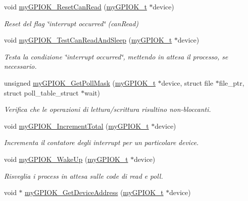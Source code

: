\begin{DoxyCompactItemize}
void \hyperlink{group___linux-_driver_ga6dc0ec06b388522ffc524e5fd14d8b72}{my\+G\+P\+I\+O\+K\+\_\+\+Reset\+Can\+Read} (\hyperlink{structmy_g_p_i_o_k__t}{my\+G\+P\+I\+O\+K\+\_\+t} $\ast$device)
\begin{DoxyCompactList}\small\item\em Reset del flag \char`\"{}interrupt occurred\char`\"{} (can\+Read) \end{DoxyCompactList}\item 
void \hyperlink{group___linux-_driver_gaf1b6f35c097c46361d675a42f122828e}{my\+G\+P\+I\+O\+K\+\_\+\+Test\+Can\+Read\+And\+Sleep} (\hyperlink{structmy_g_p_i_o_k__t}{my\+G\+P\+I\+O\+K\+\_\+t} $\ast$device)
\begin{DoxyCompactList}\small\item\em Testa la condizione \char`\"{}interrupt occurred\char`\"{}, mettendo in attesa il processo, se necessario. \end{DoxyCompactList}\item 
unsigned \hyperlink{group___linux-_driver_gae428f50a6da69e3cf89348b8ba9401b1}{my\+G\+P\+I\+O\+K\+\_\+\+Get\+Poll\+Mask} (\hyperlink{structmy_g_p_i_o_k__t}{my\+G\+P\+I\+O\+K\+\_\+t} $\ast$device, struct file $\ast$file\+\_\+ptr, struct poll\+\_\+table\+\_\+struct $\ast$wait)
\begin{DoxyCompactList}\small\item\em Verifica che le operazioni di lettura/scrittura risultino non-\/bloccanti. \end{DoxyCompactList}\item 
void \hyperlink{group___linux-_driver_ga5a7df448de9de94620ce1baf7ec388c9}{my\+G\+P\+I\+O\+K\+\_\+\+Increment\+Total} (\hyperlink{structmy_g_p_i_o_k__t}{my\+G\+P\+I\+O\+K\+\_\+t} $\ast$device)
\begin{DoxyCompactList}\small\item\em Incrementa il contatore degli interrupt per un particolare device. \end{DoxyCompactList}\item 
void \hyperlink{group___linux-_driver_gae182aa943af08c102a05795ae8526192}{my\+G\+P\+I\+O\+K\+\_\+\+Wake\+Up} (\hyperlink{structmy_g_p_i_o_k__t}{my\+G\+P\+I\+O\+K\+\_\+t} $\ast$device)
\begin{DoxyCompactList}\small\item\em Risveglia i process in attesa sulle code di read e poll. \end{DoxyCompactList}\item 
void $\ast$ \hyperlink{group___linux-_driver_ga565ffd4946b330b29e1166dfc9851b11}{my\+G\+P\+I\+O\+K\+\_\+\+Get\+Device\+Address} (\hyperlink{structmy_g_p_i_o_k__t}{my\+G\+P\+I\+O\+K\+\_\+t} $\ast$device)

\end{DoxyCompactItemize}
